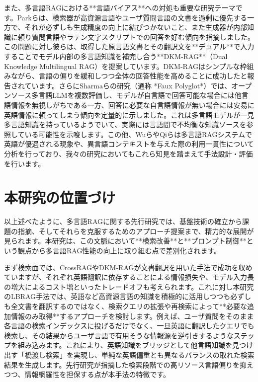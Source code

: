 \documentclass[12pt]{bxjsreport}
\begin{document}
また、多言語RAGにおける**言語バイアス**への対処も重要な研究テーマです。Parkらは、検索器が高資源言語やユーザ質問言語の文書を過剰に優先する一方で、それが必ずしも生成精度の向上に結びつかないこと、また生成器が内部知識に頼り質問言語やラテン文字スクリプトでの回答を好む傾向を指摘しました。この問題に対し彼らは、取得した原言語文書とその翻訳文を**デュアル**で入力することでモデル内部の多言語知識を補完し合う**DKM-RAG**（Dual Knowledge Multilingual RAG）を提案しています。DKM-RAGはシンプルな枠組みながら、言語の偏りを緩和しつつ全体の回答性能を高めることに成功したと報告されています。さらにSharmaらの研究（通称 *Faux Polyglot*）では、オープンソース多言語LLMを複数評価し、モデルが自言語で回答可能な場合には他言語情報を無視しがちである一方、回答に必要な自言語情報が無い場合には安易に英語情報に頼ってしまう傾向を定量的に示しました。これは多言語モデルが一見多言語知識を持っているようでいて、実際には言語間で不均衡な知識ソースを参照している可能性を示唆します。この他、WuらやQiらは多言語RAGシステムで英語が優遇される現象や、異言語コンテキストを与えた際の利用一貫性について分析を行っており、我々の研究においてもこれら知見を踏まえて手法設計・評価を行います。

\section{本研究の位置づけ}

以上述べたように、多言語RAGに関する先行研究では、基盤技術の確立から課題の指摘、そしてそれらを克服するためのアプローチ提案まで、精力的な展開が見られます。本研究は、この文脈において**検索改善**と**プロンプト制御**という観点から多言語RAG性能の向上に取り組む点で差別化されます。

まず検索面では、CrossRAGやDKM-RAGが文書翻訳を用いた手法で成功を収めていますが、それぞれ英語翻訳に依存することによる情報損失や、モデル入力長の増大によるコスト増といったトレードオフも考えられます。これに対し本研究のLBRAG手法では、英語など高資源言語の知識を積極的に活用しつつも必ずしも全文書を翻訳するのではなく、検索クエリの拡張や再検索によって**必要な追加情報のみ取得**するアプローチを検討します。例えば、ユーザ質問をそのまま各言語の検索インデックスに投げるだけでなく、一旦英語に翻訳したクエリでも検索し、その結果からユーザ言語で有用そうな情報源を逆引きするようなステップを組み込みます。これにより、英語知識をブリッジとして他言語知識を見つけ出す「橋渡し検索」を実現し、単純な英語偏重とも異なるバランスの取れた検索結果を生成します。先行研究が指摘した検索段階での高リソース言語偏りを抑えつつ、情報網羅性を担保する点が本手法の特徴です。
\end{document}

